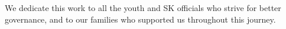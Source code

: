\begin{dedication}

\hspace*{\parindent}We dedicate this work to all the youth and SK officials who strive for better governance, and to our families who supported us throughout this journey.

\end{dedication}

